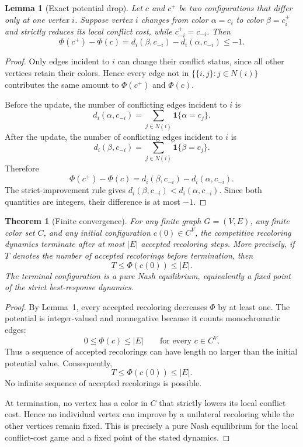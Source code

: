 \documentclass[preprint,12pt]{elsarticle}
\newtheorem{lemma}{Lemma}
\newtheorem{theorem}{Theorem}
\begin{document}
\begin{lemma}[Exact potential drop]
Let $c$ and $c^+$ be two configurations that differ only at one vertex $i$.
Suppose vertex $i$ changes from color $\alpha=c_i$ to color $\beta=c_i^+$ and
strictly reduces its local conflict cost, while $c_{-i}^+=c_{-i}$. Then
\[
    \Phi(c^+)-\Phi(c)
    =
    d_i(\beta,c_{-i})-d_i(\alpha,c_{-i})
    \le -1 .
\]
\end{lemma}

\begin{proof}
Only edges incident to $i$ can change their conflict status, since all other
vertices retain their colors. Hence every edge not in
$\{\{i,j\}:j\in N(i)\}$ contributes the same amount to $\Phi(c^+)$ and
$\Phi(c)$.

Before the update, the number of conflicting edges incident to $i$ is
\[
    d_i(\alpha,c_{-i})
    =
    \sum_{j\in N(i)} \mathbf{1}\{\alpha=c_j\}.
\]
After the update, the number of conflicting edges incident to $i$ is
\[
    d_i(\beta,c_{-i})
    =
    \sum_{j\in N(i)} \mathbf{1}\{\beta=c_j\}.
\]
Therefore
\[
    \Phi(c^+)-\Phi(c)
    =
    d_i(\beta,c_{-i})-d_i(\alpha,c_{-i}).
\]
The strict-improvement rule gives
$d_i(\beta,c_{-i})<d_i(\alpha,c_{-i})$. Since both quantities are integers,
their difference is at most $-1$.
\end{proof}

\begin{theorem}[Finite convergence]
For any finite graph $G=(V,E)$, any finite color set $C$, and any initial
configuration $c(0)\in C^V$, the competitive recoloring dynamics terminate
after at most $|E|$ accepted recoloring steps. More precisely, if $T$ denotes
the number of accepted recolorings before termination, then
\[
    T \le \Phi(c(0)) \le |E|.
\]
The terminal configuration is a pure Nash equilibrium, equivalently a fixed
point of the strict best-response dynamics.
\end{theorem}

\begin{proof}
By Lemma~1, every accepted recoloring decreases $\Phi$ by at least one. The
potential is integer-valued and nonnegative because it counts monochromatic
edges:
\[
    0 \le \Phi(c) \le |E|
    \qquad \text{for every } c\in C^V .
\]
Thus a sequence of accepted recolorings can have length no larger than the
initial potential value. Consequently,
\[
    T \le \Phi(c(0)) \le |E|.
\]
No infinite sequence of accepted recolorings is possible.

At termination, no vertex has a color in $C$ that strictly lowers its local
conflict cost. Hence no individual vertex can improve by a unilateral
recoloring while the other vertices remain fixed. This is precisely a pure
Nash equilibrium for the local conflict-cost game and a fixed point of the
stated dynamics.
\end{proof}
\end{document}

